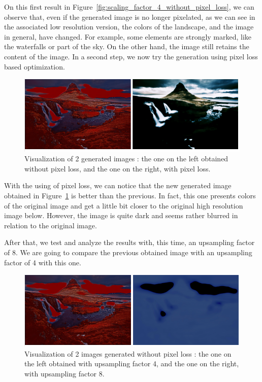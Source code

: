 \documentclass{article}
\begin{document}
{    On this first result in Figure~\ref{fig:scaling_factor_4_without_pixel_loss}, we can observe that, even if the generated image is no longer pixelated, as we can see in the associated low resolution version, the colors of the landscape, and the image in general, have changed. For example, some elements are strongly marked, like the waterfalls or part of the sky. On the other hand, the image still retains the content of the image.
    In a second step, we now try the generation using pixel loss based optimization.

    \begin{figure}[ht]
        \centering
        \includegraphics[height=0.2\textheight]{images/comparison_using_pixel_loss.png}
        \caption{Visualization of 2 generated images : the one on the left obtained without pixel loss, and the one on the right, with pixel loss.}
        \label{fig:comparison_using_pixel_loss}
    \end{figure}

    With the using of pixel loss, we can notice that the new generated image obtained in Figure~\ref{fig:comparison_using_pixel_loss} is better than the previous. In fact, this one presents colors of the original image and get a little bit closer to the original high resolution image below. However, the image is quite dark and seems rather blurred in relation to the original image.
    
     After that, we test and analyze the results with, this time, an upsampling factor of 8. We are going to compare the previous obtained image with an upsampling factor of 4 with this one.
     
    \begin{figure}[ht]
        \centering
        \includegraphics[height=0.2\textheight]{images/comparison_scaling_factor_without_pixel_loss.png}
        \caption{Visualization of 2 images generated without pixel loss : the one on the left obtained with upsampling factor 4, and the one on the right, with upsampling factor 8.}
    \label{fig:comparison_scaling_factor_without_pixel_loss}
    \end{figure}
     
}
\end{document}
